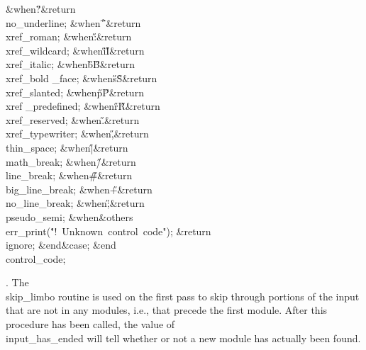\4\&{when}\8\H{?}\KR\8\?\&{return}\?\8\\{no\_underline};\6
\4\&{when}\8\H{\^}\KR\8\?\&{return}\?\8\\{xref\_roman};\6
\4\&{when}\8\H{:}\KR\8\?\&{return}\?\8\\{xref\_wildcard};\6
\4\&{when}\8\H{i}\?\mathrel{\.|}\?\H{I}\KR\8\?\&{return}\?\8\\{xref\_italic};%
\6
\4\&{when}\8\H{b}\?\mathrel{\.|}\?\H{B}\KR\8\?\&{return}\?\8\\{xref\_bold%
\_face};\6
\4\&{when}\8\H{s}\?\mathrel{\.|}\?\H{S}\KR\8\?\&{return}\?\8\\{xref\_slanted};%
\6
\4\&{when}\8\H{p}\?\mathrel{\.|}\?\H{P}\KR\8\?\&{return}\?\8\\{xref%
\_predefined};\6
\4\&{when}\8\H{r}\?\mathrel{\.|}\?\H{R}\KR\8\?\&{return}\?\8\\{xref\_reserved};%
\6
\4\&{when}\8\H{.}\KR\8\?\&{return}\?\8\\{xref\_typewriter};\6
\4\&{when}\8\H{,}\KR\8\?\&{return}\?\8\\{thin\_space};\6
\4\&{when}\8\H{|}\KR\8\?\&{return}\?\8\\{math\_break};\6
\4\&{when}\8\H{/}\KR\8\?\&{return}\?\8\\{line\_break};\6
\4\&{when}\8\H{\#}\KR\8\?\&{return}\?\8\\{big\_line\_break};\6
\4\&{when}\8\H{+}\KR\8\?\&{return}\?\8\\{no\_line\_break};\6
\4\&{when}\8\H{;}\KR\8\?\&{return}\?\8\\{pseudo\_semi};\6
\4\&{when}\8\&{others}\8\KR\6
\\{err\_print}\?\1(\?\.{"!\ Unknown\ control\ code"}\?\2)\?;\6
\?\&{return}\?\8\\{ignore};\2\6
\4\2\&{end}\8\&{case};\2\6
\&{end}\8\\{control\_code};\par
\fi

. The \\{skip\_limbo} routine is used on the first pass to skip through
portions of the input that are not in any modules, i.e., that precede
the first module. After this procedure has been called, the value of
\\{input\_has\_ended} will tell whether or not a new module has
actually been found.

